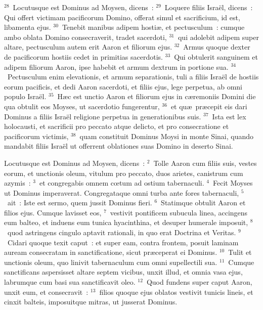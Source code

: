 ${}^{28}$~Locutusque est Dominus ad Moysen, dicens~:
${}^{29}$~Loquere filiis Isra\"el, dicens~: Qui offert victimam pacificorum Domino, offerat simul et sacrificium, id est, libamenta ejus.
${}^{30}$~Tenebit manibus adipem hosti\ae , et pectusculum~: cumque ambo oblata Domino consecraverit, tradet sacerdoti,
${}^{31}$~qui adolebit adipem super altare, pectusculum autem erit Aaron et filiorum ejus.
${}^{32}$~Armus quoque dexter de pacificorum hostiis cedet in primitias sacerdotis.
${}^{33}$~Qui obtulerit sanguinem et adipem filiorum Aaron, ipse habebit et armum dextrum in portione sua.
${}^{34}$~Pectusculum enim elevationis, et armum separationis, tuli a filiis Isra\"el de hostiis eorum pacificis, et dedi Aaron sacerdoti, et filiis ejus, lege perpetua, ab omni populo Isra\"el.
${}^{35}$~H\ae c est unctio Aaron et filiorum ejus in c\ae remoniis Domini die qua obtulit eos Moyses, ut sacerdotio fungerentur,
${}^{36}$~et qu\ae\ pr\ae cepit eis dari Dominus a filiis Isra\"el religione perpetua in generationibus suis.
${}^{37}$~Ista est lex holocausti, et sacrificii pro peccato atque delicto, et pro consecratione et pacificorum victimis,
${}^{38}$~quam constituit Dominus Moysi in monte Sinai, quando mandabit filiis Isra\"el ut offerrent oblationes suas Domino in deserto Sinai.

\lettrine[lines=3,image=true,loversize=0.05,lraise=-0.03]{L}{}ocutusque est Dominus ad Moysen, dicens~:
${}^{2}$~Tolle Aaron cum filiis suis, vestes eorum, et unctionis oleum, vitulum pro peccato, duos arietes, canistrum cum azymis~:
${}^{3}$~et congregabis omnem cœtum ad ostium tabernaculi.
${}^{4}$~Fecit Moyses ut Dominus imperaverat. Congregataque omni turba ante fores tabernaculi,
${}^{5}$~ait~: Iste est sermo, quem jussit Dominus fieri.
${}^{6}$~Statimque obtulit Aaron et filios ejus. Cumque lavisset eos,
${}^{7}$~vestivit pontificem subucula linea, accingens eum balteo, et induens eum tunica hyacinthina, et desuper humerale imposuit,
${}^{8}$~quod astringens cingulo aptavit rationali, in quo erat Doctrina et Veritas.
${}^{9}$~Cidari quoque texit caput~: et super eam, contra frontem, posuit laminam auream consecratam in sanctificatione, sicut pr\ae ceperat ei Dominus.
${}^{10}$~Tulit et unctionis oleum, quo linivit tabernaculum cum omni supellectili sua.
${}^{11}$~Cumque sanctificans aspersisset altare septem vicibus, unxit illud, et omnia vasa ejus, labrumque cum basi sua sanctificavit oleo.
${}^{12}$~Quod fundens super caput Aaron, unxit eum, et consecravit~:
${}^{13}$~filios quoque ejus oblatos vestivit tunicis lineis, et cinxit balteis, imposuitque mitras, ut jusserat Dominus.


